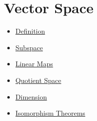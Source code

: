 \documentclass{article}
\begin{document}
\section*{Vector Space}

\begin{itemize}
\item \href{s01.html}{Definition}
\item \href{s02.html}{Subspace}
\item \href{s03.html}{Linear Maps}
\item \href{s04.html}{Quotient Space}
\item \href{s05.html}{Dimension}
\item \href{s06.html}{Isomorphism Theorems}
\end{itemize}
\end{document}

